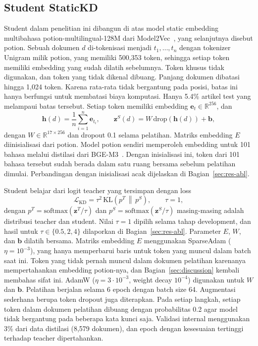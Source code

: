 \documentclass[journal]{IEEEtran}
\begin{document}
\subsection{Student StaticKD}
\label{sec:student}
Student dalam penelitian ini dibangun di atas model static embedding multibahasa potion-multilingual-128M dari Model2Vec~\cite{tulkens2024model2vec}, yang selanjutnya disebut potion. Sebuah dokumen $d$ di-tokenisasi menjadi $t_1,\dots,t_n$ dengan tokenizer Unigram milik potion, yang memiliki 500,353 token, sehingga setiap token memiliki embedding yang sudah dilatih sebelumnya. Token khusus tidak digunakan, dan token yang tidak dikenal dibuang. Panjang dokumen dibatasi hingga 1,024 token. Karena rata-rata tidak bergantung pada posisi, batas ini hanya berfungsi untuk membatasi biaya komputasi. Hanya 5.4\% artikel test yang melampaui batas tersebut. Setiap token memiliki embedding $\mathbf{e}_t\in\mathbb{R}^{256}$, dan
\begin{equation}
\mathbf{h}(d)=\frac{1}{n}\sum_{i=1}^{n}\mathbf{e}_{t_i},\qquad
\mathbf{z}^{S}(d)=W\,\mathrm{drop}(\mathbf{h}(d))+\mathbf{b},
\label{eq:student}
\end{equation}
dengan $W\in\mathbb{R}^{17\times 256}$ dan dropout 0.1 selama pelatihan. Matriks embedding $E$ diinisialisasi dari potion. Model potion sendiri memperoleh embedding untuk 101 bahasa melalui distilasi dari BGE-M3~\cite{chen2024bgem3}. Dengan inisialisasi ini, token dari 101 bahasa tersebut sudah berada dalam satu ruang bersama sebelum pelatihan dimulai. Perbandingan dengan inisialisasi acak dijelaskan di Bagian~\ref{sec:res-abl}.

Student belajar dari logit teacher yang tersimpan dengan loss
\begin{equation}
\mathcal{L}_{\mathrm{KD}}=\tau^{2}\,\mathrm{KL}\!\left(p^{T}\,\middle\|\,p^{S}\right),\qquad \tau=1 ,
\label{eq:kd}
\end{equation}
dengan $p^{T}=\mathrm{softmax}(\mathbf{z}^{T}/\tau)$ dan $p^{S}=\mathrm{softmax}(\mathbf{z}^{S}/\tau)$ masing-masing adalah distribusi teacher dan student. Nilai $\tau=1$ dipilih selama tahap development, dan hasil untuk $\tau\in\{0.5,2,4\}$ dilaporkan di Bagian~\ref{sec:res-abl}. Parameter $E$, $W$, dan $\mathbf{b}$ dilatih bersama. Matriks embedding $E$ menggunakan SparseAdam ($\eta=10^{-3}$), yang hanya memperbarui baris untuk token yang muncul dalam batch saat ini. Token yang tidak pernah muncul dalam dokumen pelatihan karenanya mempertahankan embedding potion-nya, dan Bagian~\ref{sec:discussion} kembali membahas sifat ini. AdamW ($\eta=3\cdot 10^{-3}$, weight decay $10^{-4}$) digunakan untuk $W$ dan $\mathbf{b}$. Pelatihan berjalan selama 6 epoch dengan batch size 64. Augmentasi sederhana berupa token dropout juga diterapkan. Pada setiap langkah, setiap token dalam dokumen pelatihan dibuang dengan probabilitas 0.2 agar model tidak bergantung pada beberapa kata kunci saja. Validasi internal menggunakan 3\% dari data distilasi (8,579 dokumen), dan epoch dengan kesesuaian tertinggi terhadap teacher dipertahankan.
\end{document}
